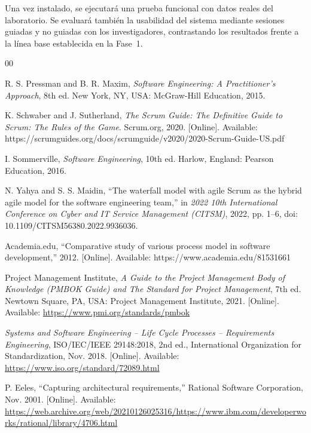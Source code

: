 \documentclass{article}
\begin{document}
Una vez instalado, se ejecutará una prueba funcional con datos reales del
laboratorio. Se evaluará también la usabilidad del sistema mediante
sesiones guiadas y no guiadas con los investigadores, contrastando los
resultados frente a la línea base establecida en la Fase~1.





\begin{thebibliography}{00}

R. S. Pressman and B. R. Maxim, \textit{Software Engineering: A Practitioner's Approach}, 8th ed. New York, NY, USA: McGraw-Hill Education, 2015.

K. Schwaber and J. Sutherland, \textit{The Scrum Guide: The Definitive Guide to Scrum: The Rules of the Game}. Scrum.org, 2020. [Online]. Available: https://scrumguides.org/docs/scrumguide/v2020/2020-Scrum-Guide-US.pdf

I. Sommerville, \textit{Software Engineering}, 10th ed. Harlow, England: Pearson Education, 2016.

N. Yahya and S. S. Maidin, “The waterfall model with agile Scrum as the hybrid agile model for the software engineering team,” in \textit{2022 10th International Conference on Cyber and IT Service Management (CITSM)}, 2022, pp. 1--6, doi: 10.1109/CITSM56380.2022.9936036.

Academia.edu, “Comparative study of various process model in software development,” 2012. [Online]. Available: https://www.academia.edu/81531661

Project Management Institute, \textit{A Guide to the Project Management Body of Knowledge (PMBOK Guide) and The Standard for Project Management}, 7th ed. Newtown Square, PA, USA: Project Management Institute, 2021. [Online]. Available: \url{https://www.pmi.org/standards/pmbok}

\textit{Systems and Software Engineering -- Life Cycle Processes -- Requirements Engineering}, ISO/IEC/IEEE 29148:2018, 2nd ed., International Organization for Standardization, Nov. 2018. [Online]. Available: \url{https://www.iso.org/standard/72089.html}

P. Eeles, “Capturing architectural requirements,” Rational Software Corporation, Nov. 2001. [Online]. Available: \url{https://web.archive.org/web/20210126025316/https://www.ibm.com/developerworks/rational/library/4706.html}


\end{thebibliography}
\end{document}
